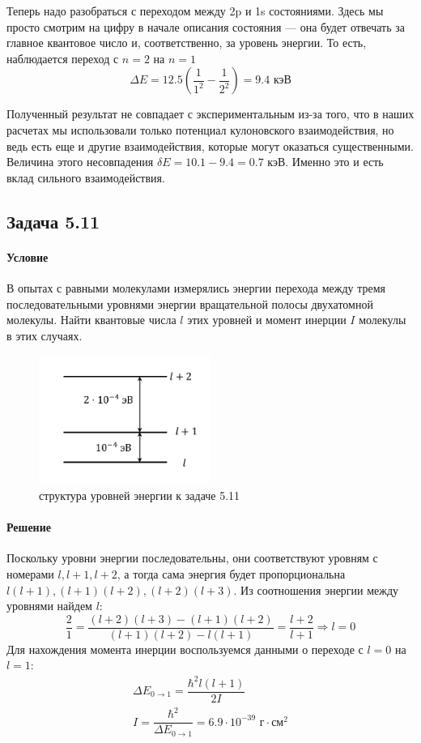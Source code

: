 \documentclass[12pt]{article}
\begin{document}
Теперь надо разобраться с переходом между 2p и 1s состояниями. Здесь мы просто смотрим на цифру в начале описания состояния --- она будет отвечать за главное квантовое число и, соответственно, за уровень энергии. То есть, наблюдается переход с $n=2$ на $n=1$
\begin{equation*}
    \Delta E = 12.5\left(\dfrac{1}{1^2} - \dfrac{1}{2^2}\right) = 9.4 \text{ кэВ}
\end{equation*}

Полученный результат не совпадает с экспериментальным из-за того, что в наших расчетах мы использовали только потенциал кулоновского взаимодействия, но ведь есть еще и другие взаимодействия, которые могут оказаться существенными. Величина этого несовпадения $\delta E = 10.1 - 9.4 = 0.7$ кэВ. Именно это и есть вклад сильного взаимодействия. 


\subsection{Задача 5.11}
\label{task_5.11}
\paragraph{Условие} В опытах с равными молекулами измерялись энергии перехода между тремя последовательными уровнями энергии вращательной полосы двухатомной молекулы. Найти
квантовые числа $l$ этих уровней и момент инерции $I$ молекулы в этих случаях.
\begin{figure}[h]
    \centering
    \includegraphics[width=0.5\textwidth,height=\textheight,keepaspectratio]{Seminar_06/pics/pic_04.pdf}
    \caption{ структура уровней энергии к задаче 5.11}
\end{figure}
\paragraph{Решение}
Поскольку уровни энергии последовательны, они соответствуют уровням с номерами $l, l+1, l+2$, а тогда сама энергия будет пропорциональна $l(l+1), (l+1)(l+2), (l+2)(l+3)$. Из соотношения энергии между уровнями найдем $l$:
\begin{equation*}
    \dfrac{2}{1} = \dfrac{(l+2)(l+3)-(l+1)(l+2)}{(l+1)(l+2)-l(l+1)} = \dfrac{l+2}{l+1} \Rightarrow l=0
\end{equation*}
Для нахождения момента инерции воспользуемся данными о переходе с $l=0$ на $l=1$:
\begin{gather*}
    \Delta E_{0\rightarrow 1} = \dfrac{\hbar^2 l(l+1)}{2I}\\
    I = \dfrac{\hbar^2}{\Delta E_{0\rightarrow 1}} = 6.9\cdot 10^{-39} \text{ г}\cdot\text{см}^2
\end{gather*}
\end{document}

